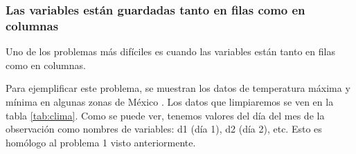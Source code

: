 \documentclass[]{article}
\newenvironment{Shaded}{\begin{snugshade}}{\end{snugshade}}
\newcommand{\KeywordTok}[1]{\textcolor[rgb]{0.13,0.29,0.53}{\textbf{#1}}}
\newcommand{\DataTypeTok}[1]{\textcolor[rgb]{0.13,0.29,0.53}{#1}}
\newcommand{\DecValTok}[1]{\textcolor[rgb]{0.00,0.00,0.81}{#1}}
\newcommand{\StringTok}[1]{\textcolor[rgb]{0.31,0.60,0.02}{#1}}
\newcommand{\CommentTok}[1]{\textcolor[rgb]{0.56,0.35,0.01}{\textit{#1}}}
\newcommand{\OperatorTok}[1]{\textcolor[rgb]{0.81,0.36,0.00}{\textbf{#1}}}
\newcommand{\NormalTok}[1]{#1}
\begin{document}
\begin{Shaded}
\end{Shaded}

\subsubsection{Las variables están guardadas tanto en filas como en
columnas}\label{las-variables-estan-guardadas-tanto-en-filas-como-en-columnas}

Uno de los problemas más difíciles es cuando las variables están tanto
en filas como en columnas.

Para ejemplificar este problema, se muestran los datos de temperatura
máxima y mínima en algunas zonas de México
\parencite[][archivo: data/weather.txt]{tidydata}. Los datos que
limpiaremos se ven en la tabla \ref{tab:clima}. Como se puede ver,
tenemos valores del día del mes de la observación como nombres de
variables: d1 (día 1), d2 (día 2), etc. Esto es homólogo al problema 1
visto anteriormente.
\end{document}
